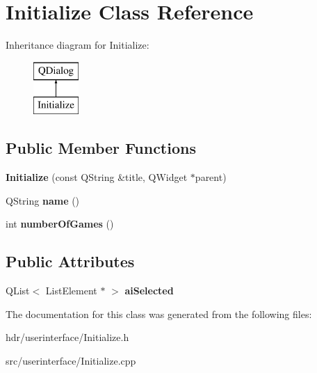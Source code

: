 \section{Initialize Class Reference}
\label{class_initialize}
Inheritance diagram for Initialize\-:\begin{figure}[H]
\begin{center}
\leavevmode
\includegraphics[height=2.000000cm]{class_initialize}
\end{center}
\end{figure}
\subsection*{Public Member Functions}
\begin{DoxyCompactItemize}
\item 
{\bfseries Initialize} (const Q\-String \&title, Q\-Widget $\ast$parent)\label{class_initialize_ac74c7a2fe5cdf5499d0798d4e487f819}

\item 
Q\-String {\bfseries name} ()\label{class_initialize_aad22139b103dbcc5ba568eec9e68e270}

\item 
int {\bfseries number\-Of\-Games} ()\label{class_initialize_a3aa15f1e0f87b9abf1c76af3acb6bd60}

\end{DoxyCompactItemize}
\subsection*{Public Attributes}
\begin{DoxyCompactItemize}
\item 
Q\-List$<$ List\-Element $\ast$ $>$ {\bfseries ai\-Selected}\label{class_initialize_a43be312fa27dc86f3bf50bdd7f7eb679}

\end{DoxyCompactItemize}


The documentation for this class was generated from the following files\-:\begin{DoxyCompactItemize}
\item 
hdr/userinterface/Initialize.\-h\item 
src/userinterface/Initialize.\-cpp\end{DoxyCompactItemize}
